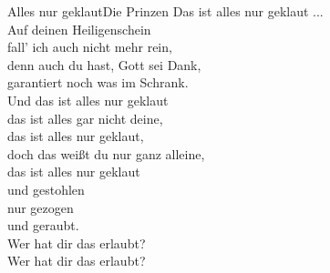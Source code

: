 \begin{lied}{Alles nur geklaut}{Die Prinzen}
Das ist alles nur geklaut ...\\

Auf deinen Heiligenschein\\
fall' ich auch nicht mehr rein,\\
denn auch du hast, Gott sei Dank,\\
garantiert noch was im Schrank.\\

Und das ist alles nur geklaut\\
das ist alles gar nicht deine,\\
das ist alles nur geklaut,\\
doch das weißt du nur ganz alleine,\\
das ist alles nur geklaut\\
und gestohlen\\
nur gezogen\\
und geraubt.\\
Wer hat dir das erlaubt?\\
Wer hat dir das erlaubt? \\
\end{lied}
